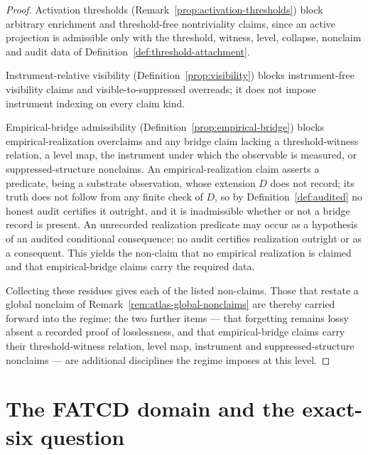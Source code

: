 \documentclass[11pt]{article}
\theoremstyle{definition}
\begin{document}
\begin{proof}
Activation thresholds (Remark~\ref{prop:activation-thresholds}) block
arbitrary enrichment and threshold-free nontriviality claims, since an
active projection is admissible only with the threshold, witness, level,
collapse, nonclaim and audit data of Definition~\ref{def:threshold-attachment}.

Instrument-relative visibility (Definition~\ref{prop:visibility}) blocks
instrument-free visibility claims and visible-to-suppressed overreads; it does
not impose instrument indexing on every claim kind.

Empirical-bridge admissibility (Definition~\ref{prop:empirical-bridge})
blocks empirical-realization overclaims and any bridge claim lacking a
threshold-witness relation, a level map, the instrument under which the
observable is measured, or suppressed-structure nonclaims. An
empirical-realization claim asserts a predicate, being a substrate
observation, whose extension \(D\) does not record; its truth does not follow
from any finite check of \(D\), so by Definition~\ref{def:audited} no honest
audit certifies it outright, and it is inadmissible whether or not a bridge
record is present. An unrecorded realization predicate may occur as a
hypothesis of an audited conditional consequence; no audit certifies
realization outright or as a consequent. This yields the non-claim that no empirical realization
is claimed and that empirical-bridge claims carry the required data.

Collecting these residues gives each of the listed non-claims. Those that
restate a global nonclaim of Remark~\ref{rem:atlas-global-nonclaims} are
thereby carried forward into the regime; the two further items --- that
forgetting remains lossy absent a recorded proof of losslessness, and that
empirical-bridge claims carry their threshold-witness relation, level map,
instrument and suppressed-structure nonclaims --- are additional disciplines the regime imposes
at this level.
\end{proof}
 \section{The FATCD domain and the exact-six question}\label{sec:fatcd-domain}
\end{document}
